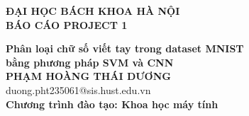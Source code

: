 \documentclass[main.tex]{subfiles}
\begin{document}
\begin{titlepage}
\thispagestyle{empty}
\begin{center}

{\textbf{\large{ĐẠI HỌC BÁCH KHOA HÀ NỘI}}}\\[4cm]

{\textbf{\huge{ BÁO CÁO PROJECT 1}}}\\[1cm]
{\textbf{\Large{Phân loại chữ số viết tay trong dataset MNIST \\
bằng phương pháp SVM và CNN }}\\[1cm]

{\textbf{\large{PHẠM HOÀNG THÁI DƯƠNG}}}\\
{\large{duong.pht235061@sis.hust.edu.vn}}\\[0.5cm]

{\textbf{\large{Chương trình đào tạo: Khoa học máy tính}}}%

\vspace{3cm}
\begin{table}[H]
\centering
{}
\end{table}}
\end{center}



\end{titlepage}
\end{document}
